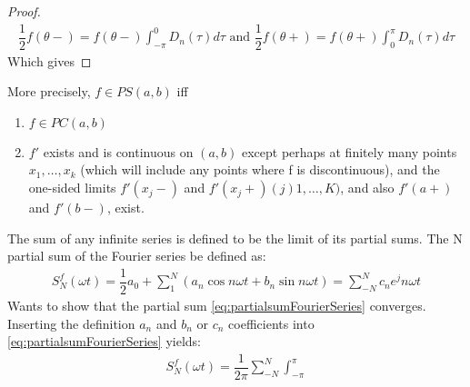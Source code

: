 \begin{proof}
	\begin{align*}
	\dfrac{1}{2} f(\theta-) = f(\theta-) \int_{-\pi}^0 D_n(\tau)d\tau \text{ and } \dfrac{1}{2}f(\theta+) = f(\theta+) \int_0^\pi D_n (\tau)d\tau
	\end{align*}
	Which gives
\end{proof}
More precisely, $f\in PS(a,b)$ iff 
\begin{enumerate}
	\item $f \in PC(a,b)$
	\item $f'$ exists and is continuous on $(a,b)$ except perhaps at finitely many points $x_1,\dots,x_k$ (which will include any points where f is discontinuous), and the one-sided limits $f'(x_j-)$ and $f'(x_j+)(j)1,\dots,K)$, and also $f'(a+)$ and $f'(b-)$, exist.
\end{enumerate}
The sum of any infinite series is defined to be the limit of its partial sums.
The N partial sum of the Fourier series be defined as:
\begin{align}\label{eq:partialsumFourierSeries}
	S_N^f(\omega t) = \dfrac{1}{2} a_0 + \sum_1^N\left(a_n \cos n\omega t + b_n \sin n \omega t \right) = \sum_{-N}^N c_n e^jn\omega t
\end{align}
Wants to show that the partial sum \eqref{eq:partialsumFourierSeries} converges.
Inserting the definition $a_n$ and $b_n$ or $c_n$ coefficients into \eqref{eq:partialsumFourierSeries} yields:
\begin{align*}
	S_N^f(\omega t) = \dfrac{1}{2\pi} \sum_{-N}^N \int_{-\pi}^\pi 
\end{align*}

